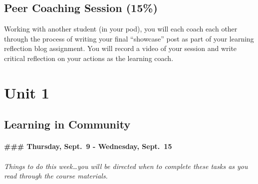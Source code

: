 \documentclass[
]{book}
\begin{document}
\hypertarget{peer-coaching-session-15}{%
\section{Peer Coaching Session (15\%)}\label{peer-coaching-session-15}}

Working with another student (in your pod), you will each coach each other through the process of writing your final ``showcase'' post as part of your learning reflection blog assignment. You will record a video of your session and write critical reflection on your actions as the learning coach.

\hypertarget{unit-1}{%
\chapter*{Unit 1}\label{unit-1}}

\hypertarget{learning-in-community}{%
\section*{Learning in Community}\label{learning-in-community}}

\hypertarget{thursday-sept.-9---wednesday-sept.-15}{%
\subsubsection*{\#\#\# Thursday, Sept.~9 - Wednesday, Sept.~15}\label{thursday-sept.-9---wednesday-sept.-15}}

\hypertarget{things-to-do-this-weekyou-will-be-directed-when-to-complete-these-tasks-as-you-read-through-the-course-materials.}{%
\subparagraph*{Things to do this week\ldots you will be directed when to complete these tasks as you read through the course materials.}\label{things-to-do-this-weekyou-will-be-directed-when-to-complete-these-tasks-as-you-read-through-the-course-materials.}}
\end{document}
